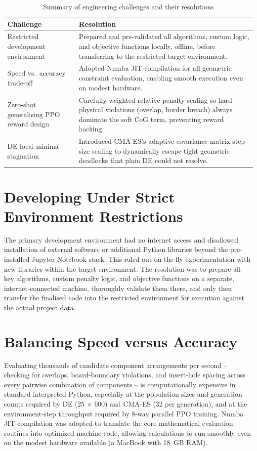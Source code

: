 \documentclass[11pt,a4paper,oneside]{report}
\begin{document}
\begin{table}[H]
\centering
\caption{Summary of engineering challenges and their resolutions}
\label{tab:challenges}
\begin{tabular}{|p{4.0cm}|p{8.2cm}|}
\hline
\textbf{Challenge} & \textbf{Resolution} \\
\hline
Restricted development environment & Prepared and pre-validated all algorithms, custom logic, and objective functions locally, offline, before transferring to the restricted target environment. \\ \hline
Speed vs.\ accuracy trade-off & Adopted Numba JIT compilation for all geometric constraint evaluation, enabling smooth execution even on modest hardware. \\ \hline
Zero-shot generalising PPO reward design & Carefully weighted relative penalty scaling so hard physical violations (overlap, border breach) always dominate the soft CoG term, preventing reward hacking. \\ \hline
DE local-minima stagnation & Introduced CMA-ES's adaptive covariance-matrix step-size scaling to dynamically escape tight geometric deadlocks that plain DE could not resolve. \\
\hline
\end{tabular}
\end{table}

\section{Developing Under Strict Environment Restrictions}
The primary development environment had no internet access and disallowed installation of external software or additional Python libraries beyond the pre-installed Jupyter Notebook stack. This ruled out on-the-fly experimentation with new libraries within the target environment. The resolution was to prepare all key algorithms, custom penalty logic, and objective functions on a separate, internet-connected machine, thoroughly validate them there, and only then transfer the finalised code into the restricted environment for execution against the actual project data.

\section{Balancing Speed versus Accuracy}
Evaluating thousands of candidate component arrangements per second -- checking for overlaps, board-boundary violations, and insert-hole spacing across every pairwise combination of components -- is computationally expensive in standard interpreted Python, especially at the population sizes and generation counts required by DE (25 $\times$ 600) and CMA-ES (32 per generation), and at the environment-step throughput required by 8-way parallel PPO training. Numba JIT compilation was adopted to translate the core mathematical evaluation routines into optimized machine code, allowing calculations to run smoothly even on the modest hardware available (a MacBook with 18~GB RAM).
\end{document}

